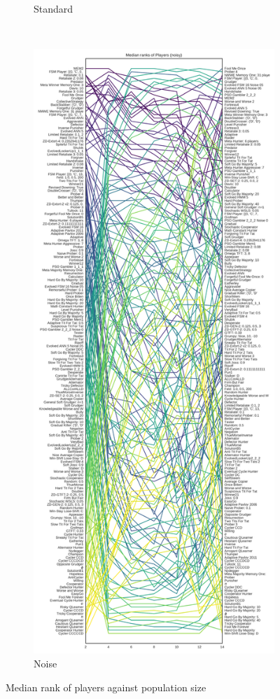\documentclass{article}
\begin{document}
\begin{figure}[!hbtp]
\begin{subfigure}{.5\textwidth}
    \caption{Standard}
    \label{fig:ranks_v_size_standard}
    \end{subfigure}%
    ~
    \begin{subfigure}{.5\textwidth}
    \centering
    \includegraphics[height=.9\textheight]{../img/median_rank_vs_population_size_noisy.pdf}
    \caption{Noise}
    \label{fig:ranks_v_size_noisy}
    \end{subfigure}
    \caption{Median rank of players against population size}

\end{figure}
\end{document}
